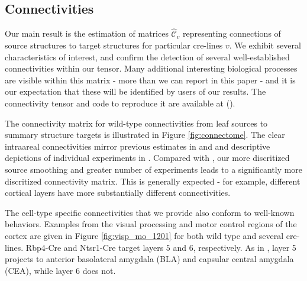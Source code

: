 \documentclass[NETN,manuscript]{stjour-new}
\newcommand{\skcomment}[1]{({\color{blue}{SK's comment:}}\textbf{\color{blue}{#1}})}
\begin{document}
\newpage

\subsection{Connectivities}

Our main result is the estimation of matrices $\hat {\mathcal C}_v$ representing connections of source structures to target structures for particular cre-lines $v$. 
We exhibit several characteristics of interest, and confirm the detection of several well-established connectivities within our tensor.
Many additional interesting biological processes are visible within this matrix - more than we can report in this paper - and it is our expectation that these will be identified by users of our results.
The connectivity tensor and code to reproduce it are available at \skcomment{footnote}.

The connectivity matrix for wild-type connectivities from leaf sources to summary structure targets is illustrated in Figure \ref{fig:connectome}.
The clear intraareal connectivities mirror previous estimates in \citet{Oh2014-kh} and \citet{Knox2019-ot} and descriptive depictions of individual experiments in \citet{Harris2019-mr}.
Compared with \citet{Knox2019-ot}, our more discritized source smoothing and greater number of experiments leads to a significantly more discritized connectivity matrix.
This is generally expected - for example, different cortical layers have more substantially different connectivities.

The cell-type specific connectivities that we provide also conform to well-known behaviors.
Examples from the visual processing and motor control regions of the cortex are given in Figure \ref{fig:visp_mo_1201} for both wild type and several cre-lines.
Rbp4-Cre and Ntsr1-Cre target layers $5$ and $6$, respectively. As in \citet{Jeong2016-dc}, layer 5 projects to anterior basolateral amygdala (BLA) and capsular central amygdala (CEA), while layer 6 does not.

\newpage
\end{document}
